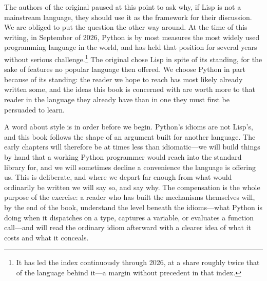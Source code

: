 The authors of the original paused at this point to ask why, if Lisp is not a
mainstream language, they should use it as the framework for their discussion.
We are obliged to put the question the other way around. At the time of this
writing, in September of 2026, Python is by most measures the most widely used
programming language in the world, and has held that position for several years
without serious challenge.\footnote{It has led the  index
continuously through 2026, at a share roughly twice that of the language
behind it---a margin without precedent in that index.} The original chose Lisp
in spite of its standing, for the sake of features no popular language then
offered. We choose Python in part because of its standing: the reader we hope
to reach has most likely already written some, and the ideas this book is
concerned with are worth more to that reader in the language they already have
than in one they must first be persuaded to learn.

A word about style is in order before we begin. Python's idioms are not Lisp's,
and this book follows the shape of an argument built for another language.
The early chapters will therefore be at times less than idiomatic---we will
build things by hand that a working Python programmer would reach into the
standard library for, and we will sometimes decline a convenience the language
is offering us. This is deliberate, and where we depart far enough from what
would ordinarily be written we will say so, and say why. The compensation is
the whole purpose of the exercise: a reader who has built the mechanisms
themselves will, by the end of the book, understand the level beneath the
idioms---what Python is doing when it dispatches on a type, captures a
variable, or evaluates a function call---and will read the ordinary idiom
afterward with a clearer idea of what it costs and what it conceals.
